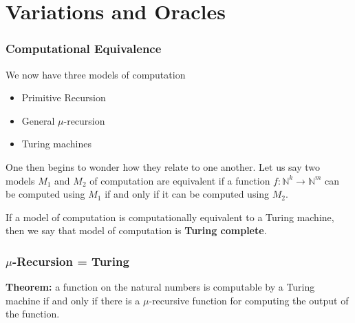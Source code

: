 \documentclass{beamer}
\begin{document}



	

\section{Variations and Oracles}

\begin{frame}
	\frametitle{Computational Equivalence}

	We now have three models of computation 

	\begin{itemize}
		\item[] Primitive Recursion
		\item[] General $\mu$-recursion 
		\item[] Turing machines
	\end{itemize}

	\vspace{0.5cm}

	One then begins to wonder how they relate to one another. Let us say two models $M_{1}$ and $M_{2}$ of computation are equivalent if a function $f:\mathbb{N}^{k} \rightarrow \mathbb{N}^{m}$ can be computed using $M_{1}$ if and only if it can be computed using $M_{2}$.

	\vspace{0.5cm}

	If a model of computation is computationally equivalent to a Turing machine, then we say that model of computation is {\bf Turing complete}. 

\end{frame}

\begin{frame}
	\frametitle{$\mu$-Recursion = Turing}

	{\bf Theorem:} a function on the natural numbers is computable by a Turing machine if and only if there is a $\mu$-recursive function for computing the output of the function.

	\vspace{7cm}

	
\end{frame}
\end{document}
